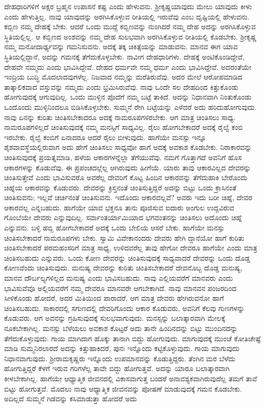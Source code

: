 ದೇಹಧಾರಿಗಳಿಗೆ ಅಕ್ಷರ ಬ್ರಹ್ಮನ ಉಪಾಸನೆ ಕಷ್ಟ ಎಂದು ಹೇಳುವನು. ಶ‍್ರೀಕೃಷ್ಣ\break ಯಾವುದು ಮೇಲು ಯಾವುದು ಕೀಳು ಎಂದು ಹೇಳುತ್ತಿಲ್ಲ. ನಾವು ಯಾವುದನ್ನು ಅರಗಿಸಿಕೊಳ್ಳುವ ರೀತಿಯಲ್ಲಿ ಇರುವೆವು ಎಂಬ ದೃಷ್ಟಿಯಲ್ಲಿ ಹೇಳುವನು. ಕಬ್ಬಿಣ ನಮ್ಮ ದೇಹಕ್ಕೆ ಬೇಕು. ಆದರೆ ಒಂದು ಮುದ್ದೆ ಕಬ್ಬಿಣವನ್ನು ನುಂಗಿದರೆ ನಮ್ಮ ದೇಹ ಅದನ್ನು ಅರಗಿಸಿಕೊಳ್ಳುವ ಸ್ಥಿತಿಯಲ್ಲಿಲ್ಲ. ಆ ಕಬ್ಬಿಣದ ಅಂಶವನ್ನು ನಮ್ಮ ದೇಹ ಸುಲಭವಾಗಿ ಅರಗಿಸಿಕೊಳ್ಳುವ ರೀತಿಯಲ್ಲಿ ಕೊಡಬೇಕು. ಶ‍್ರೀಕೃಷ್ಣ ನಮ್ಮ ಮನೋದಾರ್ಢ್ಯವನ್ನು ಗಮನಿಸುವನು. ಅದಕ್ಕೆ ತಕ್ಕ ಚಿಕಿತ್ಸೆಯನ್ನು ಮಾಡುವನು. ಮಾನವ ಈಗ ಯಾವ ಸ್ಥಿತಿಯಲ್ಲಿದ್ದಾನೆ, ಅದನ್ನು ಗಮನಕ್ಕೆ ತೆಗೆದುಕೊಳ್ಳಬೇಕು. ನಾವೀಗ ದೇಹಧಾರಿಗಳು. ದೇಹಕ್ಕೆ ಅಂಟಿಕೊಂಡಿದ್ದೇವೆ, ದೇಹವೇ ನಮ್ಮದು ಎಂದು ಭಾವಿಸಿದ್ದೇವೆ. ದೇಹದ ಧರ್ಮವೇ ನಮ್ಮ ಧರ್ಮ ಎಂದು ಭಾವಿಸಿದ್ದೇವೆ. ಅದರಂತೆಯೇ ಇಂದ್ರಿಯ ಬುದ್ಧಿ ಮೊದಲಾದವುಗಳೆಲ್ಲ. ನಿಜವಾದ ನಮ್ಮನ್ನು ಮರೆತಿರುವೆವು. ಅದರ ಮೇಲೆ ಆರೋಪಮಾಡಿದ ತಾತ್ಕಾಲಿಕವಾದ ವಸ್ತುವನ್ನು ನಮ್ಮದು ಎಂದು ಭ್ರಮಿಸಿರುವೆವು. ನಾವು ಒಂದೇ ಸಲ ದೇಹದಿಂದ ಕಿತ್ತುಕೊಂಡು ಹೋಗುವುದಕ್ಕೆ ಆಗುವುದಿಲ್ಲ. ಒಂದು ಮುಳ್ಳಿನ ಪೊದೆಗೆ ನಮ್ಮ ಬಟ್ಟೆ ತಾಕಿದೆ. ಅದನ್ನು ನಿಧಾನವಾಗಿ ನಿಂತುಕೊಂಡು ಒಂದೊಂದು ಮುಳ್ಳಿನಿಂದಲೂ ಬಿಡಿಸಿಕೊಳ್ಳಬೇಕು. ಸುಮ್ಮನೆ ರೇಗಿ ಬಟ್ಟೆಯನ್ನು ಎಳೆದರೆ ಅದು ಹರಿದುಹೋಗುವುದು. ನಾವು ಏನನ್ನು ಕುರಿತು ಚಿಂತಿಸಬೇಕಾದರೂ ಅದಕ್ಕೆ ನಾಮರೂಪಗಳಿರಬೇಕು. ಆಗ ಮಾತ್ರ ಚಿಂತಿಸಲು ಸಾಧ್ಯ. ನಾಮರೂಪಗಳಿಲ್ಲದೆ ಚಿಂತಿಸುವುದಕ್ಕೆ ನಮ್ಮ ಮನಸ್ಸಿಗೆ ಸಾಧ್ಯವಿಲ್ಲ. ರೈಲು ಹೋಗಬೇಕಾದರೆ ಅದಕ್ಕೆ ರೈಲ್ವೆ ಕಂಬಿ ಇರಬೇಕು. ರೈಲ್ವೆ ಕಂಬಿಗೆ ಏನಾದರೂ ಆದರೆ ರೈಲು ಬೀಳುವುದು. ಹಾಗೆಯೇ ಮನಸ್ಸು ಇನ್ನೂ ಶೈಶವಾವಸ್ಥೆಯಲ್ಲಿರುವಾಗ ಅದು ಹೇಗೆ ಚಿಂತಿಸಲು ಸಾಧ್ಯವೋ ಹಾಗೆ ಅದಕ್ಕೆ ಅವಕಾಶ ಕೊಡಬೇಕು. ನಿರಾಕಾರವನ್ನು ಚಿಂತಿಸುವುದಕ್ಕೆ ಪ್ರಯತ್ನಮಾಡಿ, ಹಳೆಯ ಆಕಾರಗಳನ್ನೆಲ್ಲಾ ತೆಗೆಯುವೆವು. ನಮಗೆ ಗೊತ್ತಾಗದೆ ಅವನಿಗೆ ಹೊಸ ಆಕಾರಗಳನ್ನು ಕೊಡುವೆವು. ಈ ಪ್ರಪಂಚದಲ್ಲೆಲ್ಲ ಆಗಿರುವುದು ಹೀಗೆಯೆ. ಯಾರು ತಾವು ಆಕಾರವಿಲ್ಲದ ದೇವರನ್ನು ಚಿಂತಿಸುತ್ತೇವೆ ಎಂದು ಭಾವಿಸುವರೊ ಅವರೆಲ್ಲ ದೇವರಿಗೆ ಕೊಟ್ಟ ಹಿಂದಿನ ಆಕಾರವನ್ನು ತೆಗೆದುಹಾಕಿ ಬೇರೊಂದು ಚಿಹ್ನೆಯ ಆಕಾರವನ್ನು ಕೊಡುವರು. ದೇವರನ್ನು ಕ್ರಿಸ್ತನಂತೆ ಚಿಂತಿಸುತ್ತಿದ್ದರೆ ಅದನ್ನು ಬಿಟ್ಟು ಒಂದು ಕ್ರಾಸಿನಂತೆ ಚಿಂತಿಸುವನು; ಇಲ್ಲವೆ ಚರ್ಚಿನಂತೆ ಚಿಂತಿಸುವನು. ಇದೊಂದು ಆಕಾರವಲ್ಲವೆ? ಅವರು ಇದು ಬರೀ ಚಿಹ್ನೆ, ದೇವರ ಆಕಾರವಲ್ಲ ಎನ್ನಬಹುದು. ಹಾಗೆಯೇ ಯಾವ ಭಕ್ತನೂ ತಾನು ಪೂಜಿಸುವ ಐದಾರು ಅಂಗುಲ ಉದ್ದವಿರುವ ಗೊಂಬೆಯೇ ದೇವರು ಎನ್ನುವುದಿಲ್ಲ. ಸರ್ವಾಂತರ್ಯಾಮಿಯಾದ ಭಗವಂತನನ್ನು ಚಿಂತಿಸಲು ಅದೊಂದು ಚಿಹ್ನೆ ಎನ್ನುವನು. ಬಳ್ಳಿ ಹಬ್ಬಿ ಹೋಗಬೇಕಾದರೆ ಅದಕ್ಕೆ ಒಂದು ಬೇಲಿಯ ಆಸರೆ ಬೇಕು. ಹಾಗೆಯೇ ಮನಸ್ಸು ಚಿಂತಿಸಬೇಕಾದರೆ ನಾಮರೂಪಗಳು ಬೇಕು. ಸ್ವಾಮಿ ವಿವೇಕಾನಂದರು ದೇವರು ಹೇಗಿ ದ್ದಾನೆಯೋ ಹಾಗೆ ಕುರಿತು ಚಿಂತಿಸಬೇಕಾದರೆ ಪರಮಹಂಸರಿಗೆ ಮಾತ್ರ ಸಾಧ್ಯ, ಉಳಿದವರೆಲ್ಲ ತಾವು ಹೇಗೋ ದೇವರೂ ಹಾಗೆಯೇ ಎಂದು ಮಾತ್ರ ಚಿಂತಿಸಬಹುದು ಎನ್ನುವರು. ಒಂದು ಕೋಣ ದೇವರನ್ನು ಚಿಂತಿಸುವುದಕ್ಕೆ ಸಾಧ್ಯವಾದರೆ ದೇವರನ್ನು ಒಂದು ದೊಡ್ಡ ಕೋಣವೆಂದು ಚಿಂತಿಸುವುದು. ಮನುಷ್ಯ ದೇವರನ್ನು ಕುರಿತು ಚಿಂತಿಸಬೇಕಾದರೆ ದೇವನೊಬ್ಬ ದೊಡ್ಡ ಮನುಷ್ಯ, ಮಾನವ ದೌರ್ಬಲ್ಯಗಳಿಲ್ಲದ ಮನುಷ್ಯ ಎಂದು ಭಾವಿಸಬಹುದು. ನಾವು ಎಲ್ಲಿಯವರೆಗೆ ಮಾನವರು ಎಂದು ಭಾವಿಸುವೆವೊ ಅಲ್ಲಿಯವರೆಗೆ ನಮ್ಮ ದೇವರೂ ಮಾನವರೇ ಆಗಬೇಕಾಗಿದೆ. ನಾವು ಮಾನವನ ಪಂಜರದಿಂದ ಸೀಳಿಕೊಂಡು ಹೋದರೆ, ಅದರ ಮಿತಿಯಿಂದ ಪಾರಾದರೆ, ಆಗ ಮಾತ್ರ ದೇವರು ಹೇಗಿರುವನೋ ಹಾಗೆ ಚಿಂತಿಸಬಹುದು. ಸಾಕಾರದಲ್ಲಿ ಸಗುಣದಲ್ಲಿ ದೇವರಿಗೊಂದು ಆಕಾರ ಕೊಡುವರು, ಅವನಿಗೆ ಕೆಲವು ಗುಣಗಳನ್ನು ಕೊಡುವರು. ಆಗ ಅವನನ್ನು ಗ್ರಹಿಸುವುದಕ್ಕೆ ಸುಲಭವಾಗುವುದು. ಮನಸ್ಸನ್ನು ಬಲಾತ್ಕಾರವಾಗಿ ಮೇಲಕ್ಕೆ ನೂಕಬೇಕಾಗಿಲ್ಲ. ಮನಸ್ಸು ಬೆಳೆಯಲು ಅವಕಾಶ ಕೊಟ್ಟರೆ ಅದು ತಾನೇ ಹಿಂದಿನದನ್ನು ಬಿಟ್ಟು ಮುಂದಿನದನ್ನು ತೆಗೆದುಕೊಳ್ಳುವುದು. ಗಾಯ ಮಾಗಿದಾಗ ಹೊಕ್ಕು ತಾನಾಗಿ ಬಿದ್ದು ಹೋಗುವುದು. ಮಾಗುವುದಕ್ಕೆ ಮುಂಚೆ ಕೋತಿಚೇಷ್ಟೆ ಮಾಡಿ ಸುಮ್ಮನಿರಲಾರದೆ ಅದನ್ನು ಕಿತ್ತುಹಾಕಿದರೆ, ಪುನಃ ಇನ್ನೊಂದು ಕಟ್ಟಿಕೊಳ್ಳುವುದು. ಗಾಯ ಮಾಗುವುದು ನಿಧಾನವಾಗುವುದು. ಶ‍್ರೀರಾಮಕೃಷ್ಣರು ಇನ್ನೊಂದು ಉಪಮಾನವನ್ನು ಕೊಡುತ್ತಿದ್ದರು. ತೆಂಗಿನ ಮರ ಬೆಳೆದು ಹೋಗುತ್ತಿದ್ದರೆ ಕೆಳಗೆ ಇರುವ ಗರಿಗಳೆಲ್ಲ ತಾವೇ ಬಿದ್ದು ಹೋಗುತ್ತವೆ. ಅದನ್ನು ಯಾರೂ ಬಲಾತ್ಕಾರವಾಗಿ ಕೀಳಬೇಕಾಗಿಲ್ಲ. ಹಾಗೆಯೇ ಆಧ್ಯಾತ್ಮಿಕ ಜೀವನದಲ್ಲಿ ವಿಕಾಸವಾಗುತ್ತ ಬಂದರೆ ಅನಾವಶ್ಯಕವಾಗಿರುವುದೆಲ್ಲ ತಮಗೆ ತಾವೆ ಬಿಟ್ಟು ಹೋಗುತ್ತವೆ. ಮೊದಲು ನಾವು ಆಧ್ಯಾತ್ಮಿಕ ಜೀವನವನ್ನು ಪೋಷಣೆ ಮಾಡುವುದಕ್ಕೆ ಗಮನ ಕೊಡಬೇಕು. ಅದಿಲ್ಲದೆ ಸುಮ್ಮನೆ ಗಿಡವನ್ನು ಕಸಿಮಾಡುತ್ತಾ ಹೋದರೆ ಅದು 